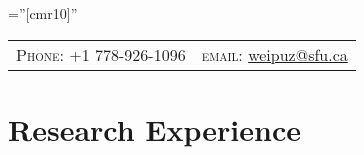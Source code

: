 \documentclass[a4paper,10pt]{article} %
\begin{document}
\pagestyle{empty} %

\font\fb=''[cmr10]'' %


\par{\bigskip\par} %

\begin{center}
\begin{tabular}{rl}
\textsc{Phone:}  +1 778-926-1096 & \textsc{email:}  \href{mailto:weipuz@sfu.ca}{weipuz@sfu.ca}
\end{tabular}
\end{center}

\section{Research Experience}
\end{document}
